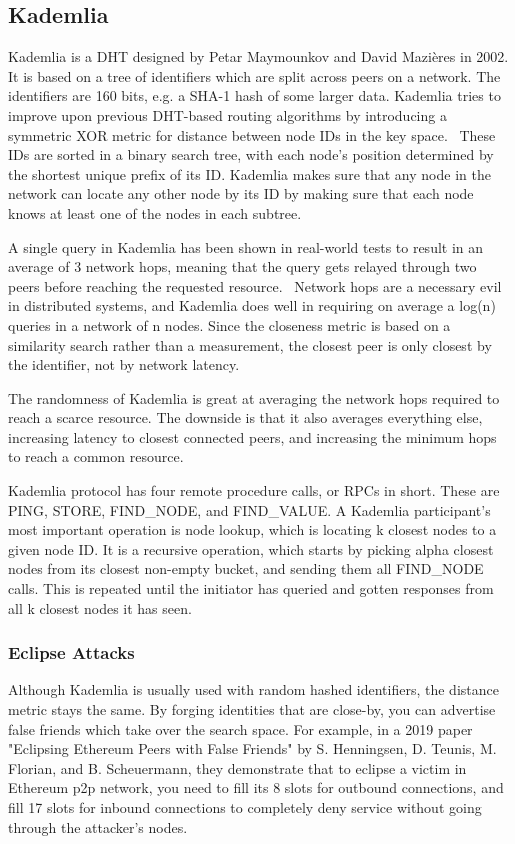 \subsection{Kademlia}
Kademlia is a DHT designed by Petar Maymounkov and David Mazières in 2002. It is based on a tree of identifiers which are split across peers on a network. The identifiers are 160 bits, e.g. a SHA-1 hash of some larger data. Kademlia tries to improve upon previous DHT-based routing algorithms by introducing a symmetric XOR metric for distance between node IDs in the key space.~\cite{Petar_Maymounkov2020-sx} These IDs are sorted in a binary search tree, with each node's position determined by the shortest unique prefix of its ID. Kademlia makes sure that any node in the network can locate any other node by its ID by making sure that each node knows at least one of the nodes in each subtree.
						
A single query in Kademlia has been shown in real-world tests to result in an average of 3 network hops, meaning that the query gets relayed through two peers before reaching the requested resource.~\cite{Roos2013-mb} Network hops are a necessary evil in distributed systems, and Kademlia does well in requiring on average a log(n) queries in a network of n nodes. Since the closeness metric is based on a similarity search rather than a measurement, the closest peer is only closest by the identifier, not by network latency.~\cite{Eigenmann2020-zm}
						
The randomness of Kademlia is great at averaging the network hops required to reach a scarce resource. The downside is that it also averages everything else, increasing latency to closest connected peers, and increasing the minimum hops to reach a common resource.

Kademlia protocol has four remote procedure calls, or RPCs in short. These are PING, STORE, FIND\_NODE, and FIND\_VALUE. A Kademlia participant's most important operation is node lookup, which is locating k closest nodes to a given node ID. It is a recursive operation, which starts by picking alpha closest nodes from its closest non-empty bucket, and sending them all FIND\_NODE calls. This is repeated until the initiator has queried and gotten responses from all k closest nodes it has seen.

\subsubsection{Eclipse Attacks}
Although Kademlia is usually used with random hashed identifiers, the distance metric stays the same. By forging identities that are close-by, you can advertise false friends which take over the search space. For example, in a 2019 paper "Eclipsing Ethereum Peers with False Friends" by S. Henningsen, D. Teunis, M. Florian, and B. Scheuermann, they demonstrate that to eclipse a victim in Ethereum p2p network, you need to fill its 8 slots for outbound connections, and fill 17 slots for inbound connections to completely deny service without going through the attacker's nodes.~\cite{Henningsen2019-mf}

